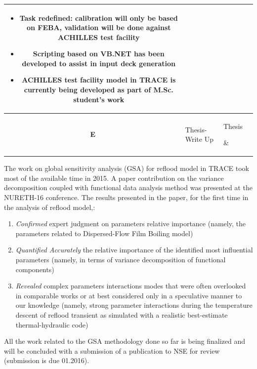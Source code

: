 \documentclass[11pt,titlepage]{article}
\begin{document}
\begin{table}[h!]
\begin{center}
\begin{tabular}{c l l l}
{\begin{itemize}[leftmargin=1em,itemsep=1pt,parsep=0pt]
						\item \textbf{Task redefined}: calibration will only be based on FEBA, validation will be done against ACHILLES test facility
						\item Scripting based on VB.NET has been developed to assist in input deck 		
							  generation
						\item ACHILLES test facility model in TRACE is currently being developed as part of M.Sc. student's work
					\end{itemize}}\\ \hline
				\textbf{E} 
				& \parbox[c]{0.2\textwidth}{
					Thesis-Write Up}
				& \parbox[c]{0.2\textwidth}{%
					Thesis} 
				& \\ 
			\bottomrule[1.5pt]
		\end{tabular}
	\end{center}
\end{table}
				
The work on global sensitivity analysis (GSA) for reflood model in TRACE took most 
of the available time in 2015. 
A paper contribution on the variance decomposition coupled with functional data analysis method was
presented at the NURETH-16 conference.
The results presented in the paper, for the first time in the analysis of reflood model,:
\begin{enumerate}
	\item \emph{Confirmed} expert judgment on parameters relative 
	importance (namely, the parameters related to Dispersed-Flow Film Boiling model)
	\item \emph{Quantified Accurately} the relative importance of the identified most influential parameters (namely, in terms of variance decomposition of functional components)
	\item \emph{Revealed} complex parameters interactions modes that were often overlooked in comparable works or at best considered only in a speculative manner to our knowledge (namely, strong parameter interactions during the temperature descent of reflood transient as simulated with a realistic best-estimate thermal-hydraulic code)
\end{enumerate}
All the work related to the GSA methodology done so far 
is being finalized and will be concluded with a submission of a publication to NSE 
for review (submission is due 01.2016).
\end{document}
